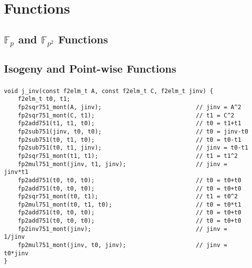 \chapter{\sidh Functions}
\label{app:functions}

\section{$\mathbb{F}_p$ and $\mathbb{F}_{p^2}$ Functions}

\section{Isogeny and Point-wise Functions}

\subsection{}

\begin{lstlisting}[basicstyle=\tiny]
void j_inv(const f2elm_t A, const f2elm_t C, f2elm_t jinv) {
	f2elm_t t0, t1;
	fp2sqr751_mont(A, jinv);                           // jinv = A^2
	fp2sqr751_mont(C, t1);                             // t1 = C^2
	fp2add751(t1, t1, t0);                             // t0 = t1+t1
	fp2sub751(jinv, t0, t0);                           // t0 = jinv-t0
	fp2sub751(t0, t1, t0);                             // t0 = t0-t1
	fp2sub751(t0, t1, jinv);                           // jinv = t0-t1
	fp2sqr751_mont(t1, t1);                            // t1 = t1^2
	fp2mul751_mont(jinv, t1, jinv);                    // jinv = jinv*t1
	fp2add751(t0, t0, t0);                             // t0 = t0+t0
	fp2add751(t0, t0, t0);                             // t0 = t0+t0
	fp2sqr751_mont(t0, t1);                            // t1 = t0^2
	fp2mul751_mont(t0, t1, t0);                        // t0 = t0*t1
	fp2add751(t0, t0, t0);                             // t0 = t0+t0
	fp2add751(t0, t0, t0);                             // t0 = t0+t0
	fp2inv751_mont(jinv);                              // jinv = 1/jinv
	fp2mul751_mont(jinv, t0, jinv);                    // jinv = t0*jinv
}
\end{lstlisting}

\subsection{}

